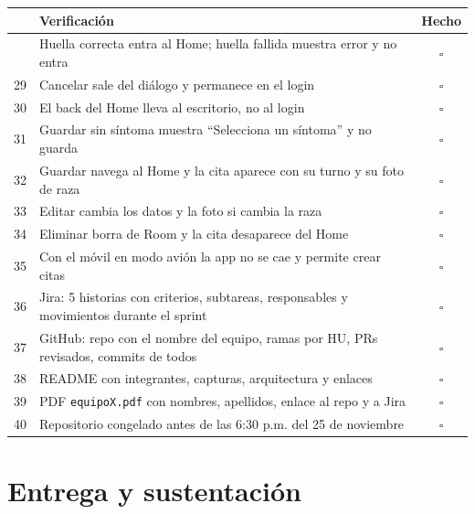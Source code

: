 \documentclass[11pt,letterpaper]{article}
\newcommand{\code}[1]{\texttt{\small #1}}
\begin{document}
\begin{center}
\small
\begin{xltabular}{\linewidth}{@{}c X c@{}}
\toprule
& \textbf{Verificaci\'on} & \textbf{Hecho}\\
\midrule
\endhead
\bottomrule
{} & Huella correcta entra al Home; huella fallida muestra error y no entra & $\square$\\
29 & Cancelar sale del di\'alogo y permanece en el login & $\square$\\
30 & El back del Home lleva al escritorio, no al login & $\square$\\
31 & Guardar sin s\'intoma muestra ``Selecciona un s\'intoma'' y no guarda & $\square$\\
32 & Guardar navega al Home y la cita aparece con su turno y su foto de raza & $\square$\\
33 & Editar cambia los datos y la foto si cambia la raza & $\square$\\
34 & Eliminar borra de Room y la cita desaparece del Home & $\square$\\
35 & Con el m\'ovil en modo avi\'on la app no se cae y permite crear citas & $\square$\\
36 & Jira: 5 historias con criterios, subtareas, responsables y movimientos durante el sprint & $\square$\\
37 & GitHub: repo con el nombre del equipo, ramas por HU, PRs revisados, commits de todos & $\square$\\
38 & README con integrantes, capturas, arquitectura y enlaces & $\square$\\
39 & PDF \code{equipoX.\allowbreak{}pdf} con nombres, apellidos, enlace al repo y a Jira & $\square$\\
40 & Repositorio congelado antes de las 6:30 p.m. del 25 de noviembre & $\square$\\
\end{xltabular}
\end{center}

\section{Entrega y sustentaci\'on}
\end{document}
